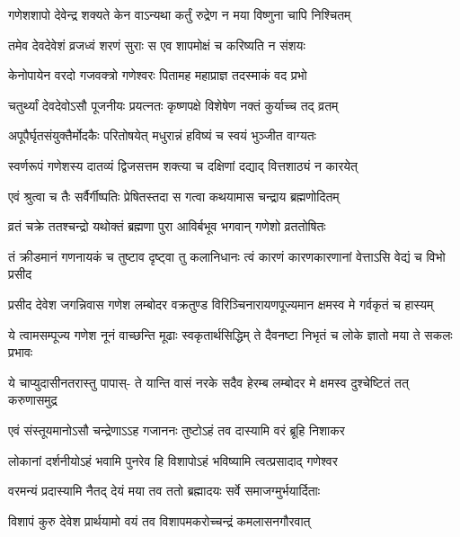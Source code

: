 \twolineshloka
{गणेशशापो देवेन्द्र शक्यते केन वाऽन्यथा}
{कर्तुं रुद्रेण न मया विष्णुना चापि निश्चितम्}%

\twolineshloka
{तमेव देवदेवेशं व्रजध्वं शरणं सुराः}
{स एव शापमोक्षं च करिष्यति न संशयः}%


\twolineshloka
{केनोपायेन वरदो गजवक्त्रो गणेश्वरः}
{पितामह महाप्राज्ञ तदस्माकं वद प्रभो}%


\twolineshloka
{चतुर्थ्यां देवदेवोऽसौ पूजनीयः प्रयत्नतः}
{कृष्णपक्षे विशेषेण नक्तं कुर्याच्च तद् व्रतम्}%

\twolineshloka
{अपूपैर्घृतसंयुक्तैर्मोदकैः परितोषयेत्}
{मधुरान्नं हविष्यं च स्वयं भुञ्जीत वाग्यतः}%

\twolineshloka
{स्वर्णरूपं गणेशस्य दातव्यं द्विजसत्तम}
{शक्त्या च दक्षिणां दद्याद् वित्तशाठ्यं न कारयेत्}%

\twolineshloka
{एवं श्रुत्वा च तैः सर्वैर्गीष्पतिः प्रेषितस्तदा}
{स गत्वा कथयामास चन्द्राय ब्रह्मणोदितम्}%

\twolineshloka
{व्रतं चक्रे ततश्चन्द्रो यथोक्तं ब्रह्मणा पुरा}
{आविर्बभूव भगवान् गणेशो व्रततोषितः}%

\fourlineindentedshloka
{तं क्रीडमानं गणनायकं च}
{तुष्टाव दृष्ट्वा तु कलानिधानः}
{त्वं कारणं कारणकारणानां}
{वेत्ताऽसि वेद्यं च विभो प्रसीद}%

\fourlineindentedshloka
{प्रसीद देवेश जगन्निवास}
{गणेश लम्बोदर वक्रतुण्ड}
{विरिञ्चिनारायणपूज्यमान}
{क्षमस्व मे गर्वकृतं च हास्यम्}%

\fourlineindentedshloka
{ये त्वामसम्पूज्य गणेश नूनं}
{वाच्छन्ति मूढाः स्वकृतार्थसिद्धिम्}
{ते दैवनष्टा निभृतं च लोके}
{ज्ञातो मया ते सकलः प्रभावः}%

\fourlineindentedshloka
{ये चाप्युदासीनतरास्तु पापास्-}
{ते यान्ति वासं नरके सदैव}
{हेरम्ब लम्बोदर मे क्षमस्व}
{दुश्चेष्टितं तत् करुणासमुद्र}%

\twolineshloka
{एवं संस्तूयमानोऽसौ चन्द्रेणाऽऽह गजाननः}
{तुष्टोऽहं तव दास्यामि वरं ब्रूहि निशाकर}%


\twolineshloka
{लोकानां दर्शनीयोऽहं भवामि पुनरेव हि}
{विशापोऽहं भविष्यामि त्वत्प्रसादाद् गणेश्वर}%


\twolineshloka
{वरमन्यं प्रदास्यामि नैतद् देयं मया तव}
{ततो ब्रह्मादयः सर्वे समाजग्मुर्भयार्दिताः}%

\twolineshloka
{विशापं कुरु देवेश प्रार्थयामो वयं तव}
{विशापमकरोच्चन्द्रं कमलासनगौरवात्}%

